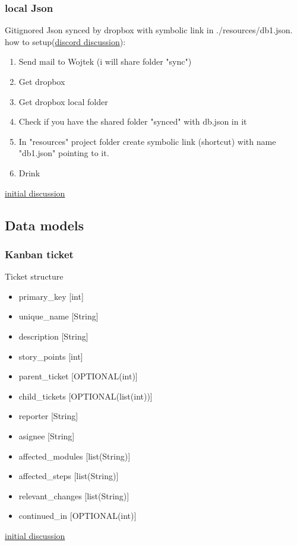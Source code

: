 \subsubsection{local Json}
Gitignored Json synced by dropbox with symbolic link in ./resources/db1.json.\\
how to setup(\href{https://discord.com/channels/892473074434310144/895768675146154004/895772874613346354}{discord discussion}):
\begin{enumerate}
    \item Send mail to Wojtek (i will share folder "sync")
    \item Get dropbox
    \item Get dropbox local folder
    \item Check if you have the shared folder "synced" with db.json in it
    \item In "resources" project folder create symbolic link (shortcut) with name "db1.json" pointing to it.
    \item Drink
\end{enumerate}

\href{https://discord.com/channels/892473074434310144/892481179624824843}{initial discussion}

\subsection{Data models}\label{MODEL:POC}
\subsubsection{Kanban ticket}
Ticket structure
\begin{itemize}
  \item primary\_key        [int]
  \item unique\_name        [String]
  \item description         [String]
  \item story\_points       [int]
  \item parent\_ticket      [OPTIONAL(int)]
  \item child\_tickets      [OPTIONAL(list(int))]
  \item reporter            [String]
  \item asignee             [String]
  \item affected\_modules   [list(String)]
  \item affected\_steps     [list(String)]
  \item relevant\_changes   [list(String)]
  \item continued\_in       [OPTIONAL(int)]
\end{itemize}
\href{https://discord.com/channels/892473074434310144/892483718495731753}{initial discussion}

